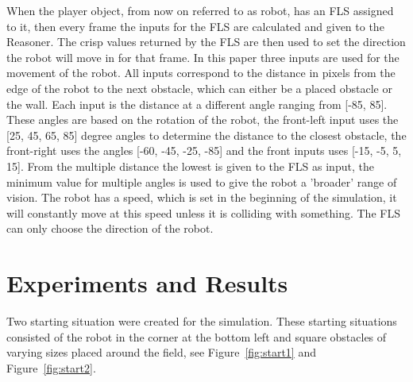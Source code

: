 \documentclass[conference]{IEEEtran}
\begin{document}
When the player object, from now on referred to as robot, has an FLS assigned to it, then every frame the inputs for the FLS are calculated and given to the Reasoner. The crisp values returned by the FLS are then used to set the direction the robot will move in for that frame. In this paper three inputs are used for the movement of the robot. All inputs correspond to the distance in pixels from the edge of the robot to the next obstacle, which can either be a placed obstacle or the wall. Each input is the distance at a different angle ranging from [-85, 85]. These angles are based on the rotation of the robot, the front-left input uses the [25, 45, 65, 85] degree angles to determine the distance to the closest obstacle, the front-right uses the angles [-60, -45, -25, -85] and the front inputs uses [-15, -5, 5, 15]. From the multiple distance the lowest is given to the FLS as input, the minimum value for multiple angles is used to give the robot a 'broader' range of vision. The robot has a speed, which is set in the beginning of the simulation, it will constantly move at this speed unless it is colliding with something. The FLS can only choose the direction of the robot.

\section{Experiments and Results}
Two starting situation were created for the simulation. These starting situations consisted of the robot in the corner at the bottom left and square obstacles of varying sizes placed around the field, see Figure~\ref{fig:start1} and Figure~\ref{fig:start2}.
\end{document}
